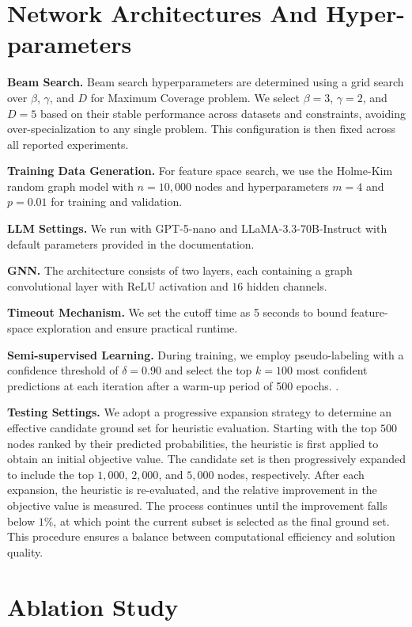 \section{Network Architectures And Hyper-parameters} \label{appendix:network}

\textbf{Beam Search.} Beam search hyperparameters are determined using a grid search over $\beta$, $\gamma$, and $D$  for Maximum Coverage problem. We select $\beta = 3$, $\gamma = 2$, and $D = 5$ based on their stable performance across datasets and constraints, avoiding over-specialization to any single problem. This configuration is then fixed across all reported experiments.

\textbf{Training Data Generation.} For feature space search, we use the Holme-Kim random graph model with $n = 10{,}000$ nodes and hyperparameters $m = 4$ and $p = 0.01$ for training and validation.

\textbf{LLM Settings.} We run with GPT-5-nano and LLaMA-3.3-70B-Instruct with default parameters provided in the documentation.

\textbf{GNN.} The architecture consists of two layers, each containing a graph convolutional layer with ReLU
activation and $16$ hidden channels.

\textbf{Timeout Mechanism.} We set the cutoff time as 5 seconds to bound feature-space exploration and ensure practical runtime.

\textbf{Semi-supervised Learning.} During training, we employ pseudo-labeling with a confidence threshold of $\delta=0.90$ and select the top $k=100$ most confident predictions at each iteration after a warm-up period of 500 epochs.
.

\textbf{Testing Settings.} We adopt a progressive expansion strategy to determine an effective candidate ground set for heuristic evaluation. Starting with the top $500$ nodes ranked by their predicted probabilities, the heuristic is first applied to obtain an initial objective value. The candidate set is then progressively expanded to include the top $1,000$, $2,000$, and $5,000$ nodes, respectively. After each expansion, the heuristic is re-evaluated, and the relative improvement in the objective value is measured. The process continues until the improvement falls below $1\%$, at which point the current subset is selected as the final ground set. This procedure ensures a balance between computational efficiency and solution quality.



\section{Ablation Study} \label{appendix:ablation}

